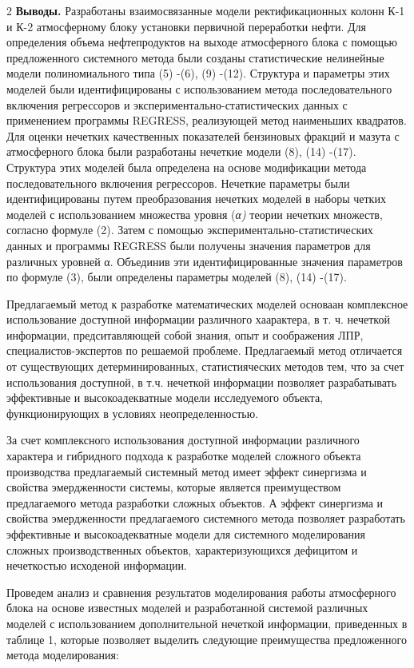 \begin{multicols}{2}
{\bfseries Выводы.} Разработаны взаимосвязанные модели ректификационных
колонн К-1 и К-2 атмосферному блоку установки первичной переработки
нефти. Для определения объема нефтепродуктов на выходе атмосферного
блока с помощью предложенного системного метода были созданы
статистические нелинейные модели полиномиального типа (5) -(6), (9)
-(12). Структура и параметры этих моделей были идентифицированы с
использованием метода последовательного включения регрессоров и
экспериментально-статистических данных с применением программы REGRESS,
реализующей метод наименьших квадратов. Для оценки нечетких качественных
показателей бензиновых фракций и мазута с атмосферного блока были
разработаны нечеткие модели (8), (14) -(17). Структура этих моделей была
определена на основе модификации метода последовательного включения
регрессоров. Нечеткие параметры были идентифицированы путем
преобразования нечетких моделей в наборы четких моделей с использованием
множества уровня (\emph{α)} теории нечетких множеств, согласно формуле
(2). Затем с помощью экспериментально-статистических данных и программы
REGRESS были получены значения параметров для различных уровней α.
Объединив эти идентифицированные значения параметров по формуле (3),
были определены параметры моделей (8), (14) -(17).

Предлагаемый метод к разработке математических моделей основаан
комплексное использование доступной информации различного хаарактера, в
т. ч. нечеткой информации, предситавляющей собой знания, опыт и
соображения ЛПР, специалистов-экспертов по решаемой проблеме.
Предлагаемый метод отличается от существующих детерминированных,
статистияческих методов тем, что за счет использования доступной, в т.ч.
нечеткой информации позволяет разрабатывать эффективные и
высокоадекватные модели исследуемого объекта, функционирующих в условиях
неопределенностью.

За счет комплексного использования доступной информации различного
характера и гибридного подхода к разработке моделей сложного объекта
производства предлагаемый системный метод имеет эффект синергизма и
свойства эмердженности системы, которые является преимуществом
предлагаемого метода разработки сложных объектов. А эффект синергизма и
свойства эмердженности предлагаемого системного метода позволяет
разработать эффективные и высокоадекватные модели для системного
моделирования сложных производственных объектов, характеризующихся
дефицитом и нечеткостью исходеной информации.

Проведем анализ и сравнения результатов моделирования работы
атмосферного блока на основе известных моделей и разработанной системой
различных моделей с использованием дополнительной нечеткой информации,
приведенных в таблице 1, которые позволяет выделить следующие
преимущества предложенного метода моделирования:


\end{multicols}
